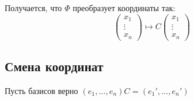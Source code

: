 Получается, что \( \Phi \) преобразует координаты так:
\[
    \begin{pmatrix}
        x_1
        \\
        \vdots
        \\
        x_n
    \end{pmatrix}
    \mapsto
    C
    \begin{pmatrix}
        x_1
        \\
        \vdots
        \\
        x_n
    \end{pmatrix}
\]

\subsection{Смена координат}

Пусть базисов верно \( (e_1, \ldots, e_n) C = (e_1', \ldots, e_n') \)

